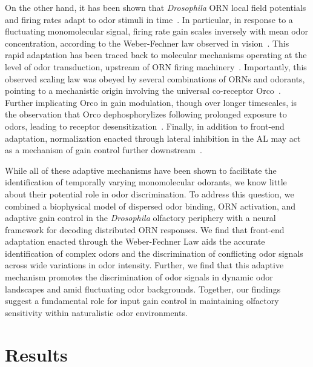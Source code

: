 On the other hand, it has been shown that \textit{Drosophila} ORN local field potentials and firing rates adapt to odor stimuli in time~\cite{martelli, srinivas_elife, cao_WL}. In particular, in response to a fluctuating monomolecular signal, firing rate gain scales inversely with mean odor concentration, according to the Weber-Fechner law observed in vision~\cite{cao_WL, cafaro_WL, srinivas_elife}. This rapid adaptation has been traced back to molecular mechanisms operating at the level of odor transduction, upstream of ORN firing machinery~\cite{srinivas_elife}. Importantly, this observed scaling law was obeyed by several combinations of ORNs and odorants, pointing to a mechanistic origin involving the universal co-receptor Orco~\cite{Orco}. Further implicating Orco in gain modulation, though over longer timescales, is the observation that Orco dephosphorylizes following prolonged exposure to odors, leading to receptor desensitization~\cite{Guo_Smith_review, Guo_Smith}. Finally, in addition to front-end adaptation, normalization enacted through lateral inhibition in the AL may act as a mechanism of gain control further downstream~\cite{divisive_normalization}.

While all of these adaptive mechanisms have been shown to facilitate the identification of temporally varying monomolecular odorants, we know  little about their potential role in odor discrimination. To address this question, we combined a biophysical model of dispersed odor binding, ORN activation, and adaptive gain control in the \textit{Drosophila} olfactory periphery with a neural framework for decoding distributed ORN responses. We find that front-end adaptation enacted through the Weber-Fechner Law aids the accurate identification of complex odors and the discrimination of conflicting odor signals across wide variations in odor intensity. Further, we find that this adaptive mechanism promotes the discrimination of odor signals in dynamic odor landscapes and amid fluctuating odor backgrounds. Together, our findings suggest a fundamental role for input gain control in maintaining olfactory sensitivity within naturalistic odor environments. 






\section{Results}






